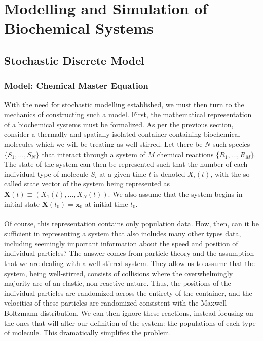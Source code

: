 \documentclass[ugrad,lot,lof,openright,11pt,oneside,onehalfspace]{RUthesis}
\begin{document}
	\section{Modelling and Simulation of Biochemical Systems}

		\subsection{Stochastic Discrete Model}

			\subsubsection{Model: Chemical Master Equation}

				With the need for stochastic modelling established, we must then turn to the mechanics of constructing such a model. First, the mathematical representation of a biochemical systems must be formalized. As per the previous section, consider a thermally and spatially isolated container containing biochemical molecules which we will be treating as well-stirred. Let there be $N$ such species $\{S_1,\ldots,S_N\}$ that interact through a system of $M$ chemical reactions $\{R_1,\ldots,R_M\}$. The state of the system can then be represented such that the number of each individual type of molecule $S_i$ at a given time $t$ is denoted $X_i(t)$, with the so-called state vector of the system being represented as $\mathbf{X}(t) \equiv (X_{1}(t),\ldots,X_{N}(t))$. We also assume that the system begins in initial state $\mathbf{X}(t_0) = \mathbf{x}_0$ at initial time $t_0$.\\
				\\
				Of course, this representation contains only population data. How, then, can it be sufficient in representing a system that also includes many other types data, including seemingly important information about the speed and position of individual particles? The answer comes from particle theory and the assumption that we are dealing with a well-stirred system. They allow us to assume that the system, being well-stirred, consists of collisions where the overwhelmingly majority are of an elastic, non-reactive nature. Thus, the positions of the individual particles are randomized across the entirety of the container, and the velocities of these particles are randomized consistent with the Maxwell-Boltzmann distribution. We can then ignore these reactions, instead focusing on the ones that will alter our definition of the system: the populations of each type of molecule. This dramatically simplifies the problem.\\
\end{document}
